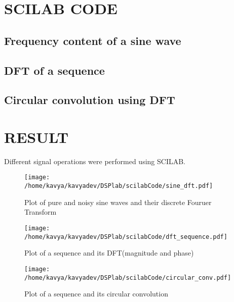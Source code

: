 \section{SCILAB CODE}
\subsection{Frequency content of a sine wave}




\subsection{DFT of a sequence}



\subsection{Circular convolution using DFT}



\section{RESULT}
Different signal operations were performed using SCILAB.
\begin{figure}
\texttt{[image: /home/kavya/kavyadev/DSPlab/scilabCode/sine\_dft.pdf]}
\caption{Plot of pure and noisy sine waves and their discrete Fouruer Transform}
\label{sine_dft}
\end{figure}

\begin{figure}
\texttt{[image: /home/kavya/kavyadev/DSPlab/scilabCode/dft\_sequence.pdf]}
\caption{Plot of a sequence and its DFT(magnitude and phase)}
\label{dft_sequence}
\end{figure}

\begin{figure}
\texttt{[image: /home/kavya/kavyadev/DSPlab/scilabCode/circular\_conv.pdf]}
\caption{Plot of a sequence and its circular convolution}
\label{circular_conv}
\end{figure}